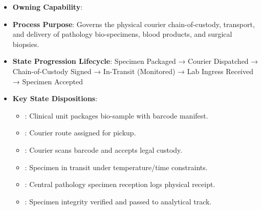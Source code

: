 \begin{itemize}

\item
\textbf{Owning Capability}: \texttt{}



\item
\textbf{Process Purpose}: Governs the physical courier chain-of-custody, transport, and delivery of pathology bio-specimens, blood products, and surgical biopsies.



\item
\textbf{State Progression Lifecycle}: Specimen Packaged → Courier Dispatched → Chain-of-Custody Signed → In-Transit (Monitored) → Lab Ingress Received → Specimen Accepted



\item
\textbf{Key State Dispositions}:


\begin{itemize}

\item
\texttt{}: Clinical unit packages bio-sample with barcode manifest.



\item
\texttt{}: Courier route assigned for pickup.



\item
\texttt{}: Courier scans barcode and accepts legal custody.



\item
\texttt{}: Specimen in transit under temperature/\allowbreak{}time constraints.



\item
\texttt{}: Central pathology specimen reception logs physical receipt.



\item
\texttt{}: Specimen integrity verified and passed to analytical track.



\end{itemize}


\end{itemize}

